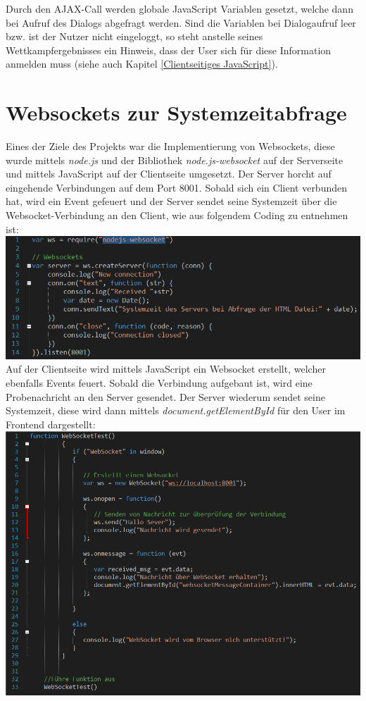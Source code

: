 Durch den AJAX-Call werden globale JavaScript Variablen gesetzt, welche dann bei Aufruf des Dialogs abgefragt werden. Sind die Variablen bei Dialogaufruf leer bzw. ist der Nutzer nicht eingeloggt, so steht anstelle seines Wettkampfergebnisses ein Hinweis, dass der User sich für diese Information anmelden muss (siehe auch Kapitel \vref{Clientseitiges JavaScript}).

\pagebreak
\section{Websockets zur Systemzeitabfrage}
Eines der Ziele des Projekts war die Implementierung von Websockets, diese wurde mittels \textit{node.js} und der Bibliothek \textit{node.js-websocket}
auf der Serverseite und mittels JavaScript auf der Clientseite umgesetzt. Der Server horcht auf eingehende Verbindungen auf dem Port 8001. Sobald sich ein Client verbunden hat, wird ein Event gefeuert und der Server sendet seine Systemzeit \"uber die Websocket-Verbindung an den Client, wie aus folgendem Coding zu entnehmen ist:  
\newline
\includegraphics[width=1\textwidth]{img/vincent/abb02.png}
\newline
Auf der Clientseite wird mittels JavaScript ein Websocket erstellt, welcher ebenfalls Events feuert. Sobald die Verbindung aufgebaut ist, wird eine Probenachricht an den Server gesendet. Der Server wiederum sendet seine Systemzeit, diese wird dann mittels \textit{document.getElementById} f\"ur den User im Frontend dargestellt: 
\newline
\includegraphics[width=1\textwidth]{img/vincent/abb03.png}
